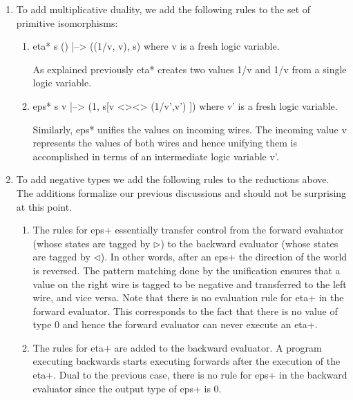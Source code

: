 \documentclass[preprint]{sigplanconf}
\begin{document}
\begin{enumerate}
\item 
To add multiplicative duality, we add the following rules to the set
of primitive isomorphisms:

\begin{enumerate}
\item {{eta* s () |--> ((1/v, v), s)}}
  where {{v}} is a fresh logic variable. 

As explained previously {{eta*}} creates two values {{1/v}} and {{1/v}}
from a single logic variable. 

\item {{eps* s v |--> (1, s[v <><> (1/v',v') ])}}
  where {{v'}} is a fresh logic variable. 

Similarly, {{eps*}} unifies the values on incoming wires. The incoming
value {{v}} represents the values of both wires and hence unifying
them is accomplished in terms of an intermediate logic variable
{{v'}}.

\end{enumerate}

\item To add negative types we add the following rules to the
  reductions above. The additions formalize our previous discussions
  and should not be surprising at this point.

  \begin{enumerate}
  \item The rules for {{eps+}} essentially transfer control from the
    forward evaluator (whose states are tagged by $\triangleright$) to
    the backward evaluator (whose states are tagged by
    $\triangleleft$). In other words, after an {{eps+}} the direction
    of the world is reversed. The pattern matching done by the
    unification ensures that a value on the {{right}} wire is tagged
    to be negative and transferred to the {{left}} wire, and vice versa.
    Note that there is no evaluation rule for {{eta+}} in the forward
    evaluator. This corresponds to the fact that there is no value of
    type {{0}} and hence the forward evaluator can never execute an
    {{eta+}}.

    \item The rules for {{eta+}} are added to the backward evaluator. A
      program executing backwards starts executing forwards after the
      execution of the {{eta+}}. Dual to the previous case, there is
      no rule for {{eps+}} in the backward evaluator since the output
      type of {{eps+}} is {{0}}.

  \end{enumerate}

\end{enumerate}
\end{document}
